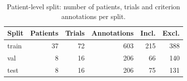 \begin{table}[t]\centering\small
\caption{Patient-level split: number of patients, trials and criterion annotations per split.}\label{tab:data}
\begin{tabular}{lrrrrr}
\toprule
Split & Patients & Trials & Annotations & Incl. & Excl. \\
\midrule
train & 37 & 72 & 603 & 215 & 388 \\
val & 8 & 16 & 206 & 66 & 140 \\
test & 8 & 16 & 206 & 75 & 131 \\
\bottomrule
\end{tabular}
\end{table}
